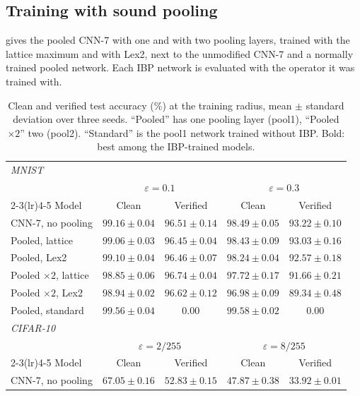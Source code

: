 \documentclass[preprint,12pt]{elsarticle}
\theoremstyle{definition}
\newcommand{\eps}{\varepsilon}
\begin{document}
\subsection{Training with sound pooling}

 gives the pooled CNN-7 with one and with two pooling layers, trained with the lattice maximum and with Lex2, next to the unmodified CNN-7 and a normally trained pooled network. Each IBP network is evaluated with the operator it was trained with.

\begin{table}[ht]
\centering\small
\setlength{\tabcolsep}{4pt}
\caption{Clean and verified test accuracy (\%) at the training radius, mean $\pm$ standard deviation over three seeds. ``Pooled'' has one pooling layer (pool1), ``Pooled $\times2$'' two (pool2). ``Standard'' is the pool1 network trained without IBP. Bold: best among the IBP-trained models.}
\label{tab:train}
\begin{tabular}{lcccc}
\toprule
\multicolumn{5}{l}{\emph{MNIST}} \\
 & \multicolumn{2}{c}{$\eps=0.1$} & \multicolumn{2}{c}{$\eps=0.3$} \\
\cmidrule(lr){2-3}\cmidrule(lr){4-5}
Model & Clean & Verified & Clean & Verified \\
\midrule
CNN-7, no pooling & $\mathbf{99.16\pm0.04}$ & $96.51\pm0.14$ & $\mathbf{98.49\pm0.05}$ & $\mathbf{93.22\pm0.10}$ \\
Pooled, lattice   & $99.06\pm0.03$ & $96.45\pm0.04$ & $98.43\pm0.09$ & $93.03\pm0.16$ \\
Pooled, Lex2      & $99.10\pm0.04$ & $96.46\pm0.07$ & $98.24\pm0.04$ & $92.57\pm0.18$ \\
Pooled $\times2$, lattice & $98.85\pm0.06$ & $\mathbf{96.74\pm0.04}$ & $97.72\pm0.17$ & $91.66\pm0.21$ \\
Pooled $\times2$, Lex2    & $98.94\pm0.02$ & $96.62\pm0.12$ & $96.98\pm0.09$ & $89.34\pm0.48$ \\
Pooled, standard  & $99.56\pm0.04$ & $0.00$ & $99.58\pm0.02$ & $0.00$ \\
\midrule
\multicolumn{5}{l}{\emph{CIFAR-10}} \\
 & \multicolumn{2}{c}{$\eps=2/255$} & \multicolumn{2}{c}{$\eps=8/255$} \\
\cmidrule(lr){2-3}\cmidrule(lr){4-5}
Model & Clean & Verified & Clean & Verified \\
\midrule
CNN-7, no pooling & $67.05\pm0.16$ & $52.83\pm0.15$ & $47.87\pm0.38$ & $33.92\pm0.01$ \\

\end{tabular}
\end{table}
\end{document}
